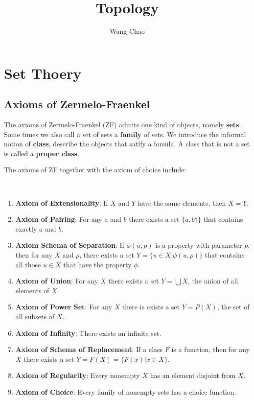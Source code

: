 \documentclass[12pt]{book}
\title{Topology}
\author{Wang Chao}
\begin{document}
 

\maketitle 
\tableofcontents

\part{Set Thoery}
\chapter{Axioms of Zermelo-Fraenkel}
The axioms of Zermelo-Fraenkel (ZF) admits one kind of objects, namely {\bf sets}. Some times we also call a set of sets a {\bf family} of sets. We introduce the informal notion of {\bf class}, describe the objects that satify a fomula. A class that is not a set is called a {\bf proper class}.

The axioms of ZF together with the axiom of choice include:
\begin{axiom}[ZFC]
	\
	\begin{enumerate}
		\item {\bf Axiom of Extensionality}: If $X$ and $Y$ have the same elements, then $X=Y$.
		\item {\bf Axiom of Pairing}: For any $a$ and $b$ there exists a set $\{a,b†\}$ that contains exactly $a$ and $b$.
		\item {\bf Axiom Schema of Separation}: If $\phi(u,p)$ is a property with parameter $p$, then for any $X$ and $p$, there exists a set $Y=\{u\in X|\phi(u,p)\}$ that contains all those $u\in X$ that have the property $\phi$.
		\item {\bf Axiom of Union}: For any $X$ there exists a set $Y=\bigcup X$, the union of all elements of $X$.
		\item {\bf Axiom of Power Set}: For any $X$ there is exists a set $Y=P(X)$, the set of all subsets of $X$.
		\item {\bf Axiom of Infinity}: There exists an infinite set.
		\item {\bf Axiom of Schema of Replacement}: If a class $F$ is a function, then for any $X$ there exists a set $Y=F(X)=\{F(x)|x\in X\}$.
		\item {\bf Axiom of Regularity}: Every nonempty $X$ has an element disjoint from $X$.
		\item {\bf Axiom of Choice}: Every family of nonempty sets has a choice function.
	\end{enumerate}
\end{axiom}
\end{document}
